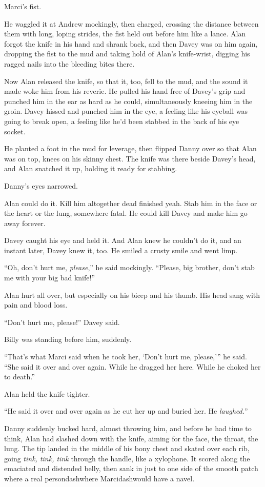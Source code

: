 Marci's fist.

He waggled it at Andrew mockingly, then charged, crossing the distance
between them with long, loping strides, the fist held out before him
like a lance.  Alan forgot the knife in his hand and shrank back, and
then Davey was on him again, dropping the fist to the mud and taking
hold of Alan's knife-wrist, digging his ragged nails into the bleeding
bites there.

Now Alan released the knife, so that it, too, fell to the mud, and the
sound it made woke him from his reverie.  He pulled his hand free of
Davey's grip and punched him in the ear as hard as he could,
simultaneously kneeing him in the groin.  Davey hissed and punched him
in the eye, a feeling like his eyeball was going to break open, a
feeling like he'd been stabbed in the back of his eye socket.

He planted a foot in the mud for leverage, then flipped Danny over so
that Alan was on top, knees on his skinny chest.  The knife was there
beside Davey's head, and Alan snatched it up, holding it ready for
stabbing.

Danny's eyes narrowed.

Alan could do it.  Kill him altogether dead finished yeah.  Stab him
in the face or the heart or the lung, somewhere fatal.  He could kill
Davey and make him go away forever.

Davey caught his eye and held it.  And Alan knew he couldn't do it,
and an instant later, Davey knew it, too.  He smiled a crusty smile
and went limp.

``Oh, don't hurt me, \textit{please},'' he said mockingly.  ``Please,
big brother, don't stab me with your big bad knife!''

Alan hurt all over, but especially on his bicep and his thumb.  His
head sang with pain and blood loss.

``Don't hurt me, please!'' Davey said.

Billy was standing before him, suddenly.

``That's what Marci said when he took her, `Don't hurt me, please,'''
he said.  ``She said it over and over again.  While he dragged her
here.  While he choked her to death.''

Alan held the knife tighter.

``He said it over and over again as he cut her up and buried her.  He
\textit{laughed.}''

Danny suddenly bucked hard, almost throwing him, and before he had
time to think, Alan had slashed down with the knife, aiming for the
face, the throat, the lung.  The tip landed in the middle of his bony
chest and skated over each rib, going \textit{tink, tink, tink}
through the handle, like a xylophone.  It scored along the emaciated
and distended belly, then sank in just to one side of the smooth patch
where a real persondash{}where Marcidash{}would have a navel.

